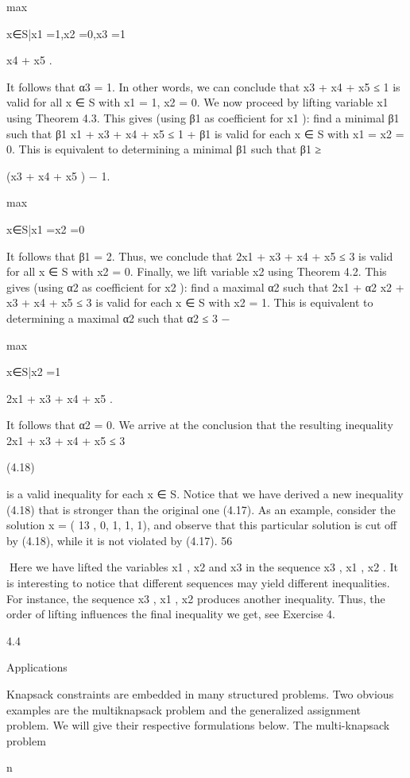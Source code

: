 max

x∈S|x1 =1,x2 =0,x3 =1

x4 + x5 .

It follows that α3 = 1. In other words, we can conclude that x3 + x4 + x5 ≤ 1 is valid for all x ∈ S with
x1 = 1, x2 = 0.
We now proceed by lifting variable x1 using Theorem 4.3. This gives (using β1 as coefficient for x1 ): find
a minimal β1 such that β1 x1 + x3 + x4 + x5 ≤ 1 + β1 is valid for each x ∈ S with x1 = x2 = 0. This is
equivalent to determining a minimal β1 such that
β1 ≥

(x3 + x4 + x5 ) − 1.

max

x∈S|x1 =x2 =0

It follows that β1 = 2. Thus, we conclude that 2x1 + x3 + x4 + x5 ≤ 3 is valid for all x ∈ S with x2 = 0.
Finally, we lift variable x2 using Theorem 4.2. This gives (using α2 as coefficient for x2 ): find a maximal
α2 such that 2x1 + α2 x2 + x3 + x4 + x5 ≤ 3 is valid for each x ∈ S with x2 = 1. This is equivalent to
determining a maximal α2 such that
α2 ≤ 3 −

max

x∈S|x2 =1

2x1 + x3 + x4 + x5 .

It follows that α2 = 0. We arrive at the conclusion that the resulting inequality
2x1 + x3 + x4 + x5 ≤ 3

(4.18)

is a valid inequality for each x ∈ S. Notice that we have derived a new inequality (4.18) that is stronger
than the original one (4.17). As an example, consider the solution x = ( 13 , 0, 1, 1, 1), and observe that
this particular solution is cut off by (4.18), while it is not violated by (4.17).
56

Here we have lifted the variables x1 , x2 and x3 in the sequence x3 , x1 , x2 . It is interesting to notice that
different sequences may yield different inequalities. For instance, the sequence x3 , x1 , x2 produces another
inequality. Thus, the order of lifting influences the final inequality we get, see Exercise 4.

4.4

Applications

Knapsack constraints are embedded in many structured problems. Two obvious examples are the multiknapsack problem and the generalized assignment problem. We will give their respective formulations
below.
The multi-knapsack problem

n


